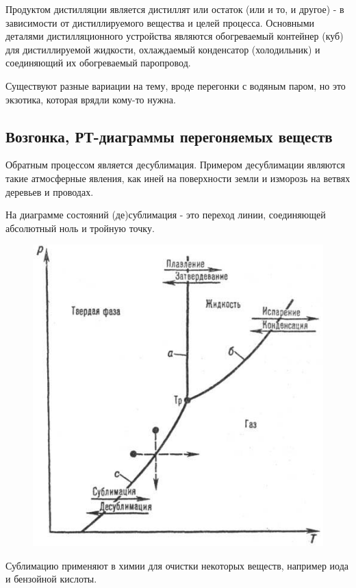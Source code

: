 \documentclass[14pt,a4paper]{scrartcl}
\begin{document}
Продуктом дистилляции является дистиллят или остаток (или и то, и другое) - в зависимости от дистиллируемого вещества и целей процесса. Основными деталями дистилляционного устройства являются обогреваемый контейнер (куб) для дистиллируемой жидкости, охлаждаемый конденсатор (холодильник) и соединяющий их обогреваемый паропровод.

Существуют разные вариации на тему, вроде перегонки с водяным паром, но это экзотика, которая врядли кому-то нужна.


\subsection*{Возгонка, РТ-диаграммы перегоняемых веществ}

Обратным процессом является десублимация. Примером десублимации являются такие атмосферные явления, как иней на поверхности земли и изморозь на ветвях деревьев и проводах.

На диаграмме состояний (де)сублимация - это переход линии, соединяющей абсолютный ноль и тройную точку.

\begin{figure}[H]
\centering
\includegraphics[scale=.50]{sublimation.jpg}
\caption{}
\label{}
\end{figure}

Сублимацию применяют в химии для очистки некоторых веществ, например иода и бензойной кислоты.
\end{document}
